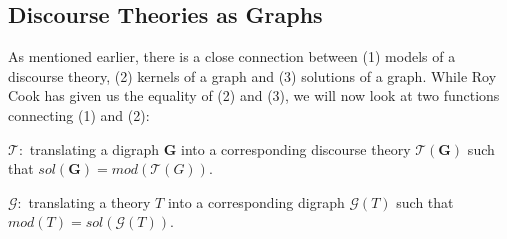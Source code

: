 \subsection{Discourse Theories as Graphs}
\label{sub:Discourse Theories as Graphs}
As mentioned earlier, there is a close connection between (1) models of a discourse theory, (2) kernels of a graph and (3) solutions of a graph.  While Roy Cook has given us the equality of (2) and (3), we will now look at two functions connecting (1) and (2):

$\mathcal{T}:$ translating a digraph \textbf{G} into a corresponding discourse theory $\mathcal{T}(\mathbf{G})$ such that $sol(\mathbf{G}) = mod(\mathcal{T}(G))$.

$\mathcal{G}:$ translating a theory $T$ into a corresponding digraph $\mathcal{G}(T)$ such that $mod(T) = sol(\mathcal{G}(T))$.
